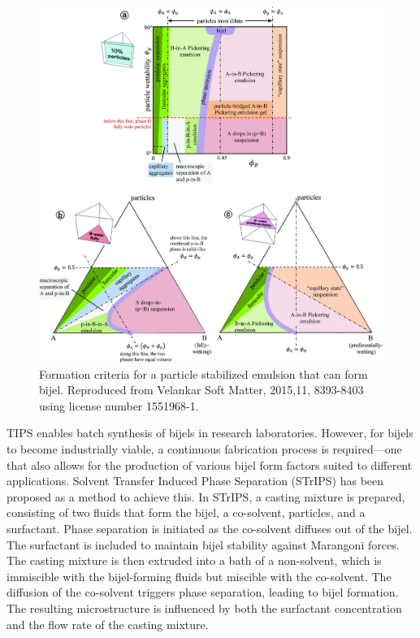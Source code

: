 \begin{figure}
    \centering
    \includegraphics[scale = 0.3]{figures/literature_review/state_diagram.jpg}
    \caption{Formation criteria for a particle stabilized emulsion that can form bijel. \cite{velankar_non-equilibrium_2015}
            Reproduced from Velankar Soft Matter, 2015,11, 8393-8403 using license number 1551968-1.}
    \label{fig:state_diagram_particle_emulsions}
\end{figure}

TIPS enables batch synthesis of bijels in research laboratories. However, for bijels to become industrially viable, a continuous fabrication process is required—one 
that also allows for the production of various bijel form factors suited to different applications. Solvent Transfer Induced Phase Separation (STrIPS) has been proposed 
as a method to achieve this. In STrIPS, a casting mixture is prepared, consisting of two fluids that form the bijel, a co-solvent, particles, and a surfactant. Phase 
separation is initiated as the co-solvent diffuses out of the bijel. The surfactant is included to maintain bijel stability against Marangoni forces. The casting mixture 
is then extruded into a bath of a non-solvent, which is immiscible with the bijel-forming fluids but miscible with the co-solvent. The diffusion of the co-solvent triggers 
phase separation, leading to bijel formation. The resulting microstructure is influenced by both the surfactant concentration and the flow rate of the casting mixture.

